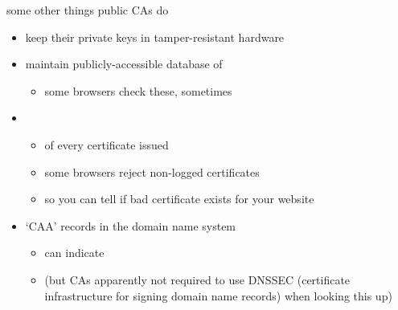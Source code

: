 \begin{frame}{some other things public CAs do}
    \begin{itemize}
    \item keep their private keys in tamper-resistant hardware
    \item maintain publicly-accessible database of 
        \begin{itemize}
        \item some browsers check these, sometimes
        \end{itemize}
    \item {}
        \begin{itemize}
            \item {} of every certificate issued
            \item some browsers reject non-logged certificates
            \item so you can tell if bad certificate exists for your website
        \end{itemize}
    \item `CAA' records in the domain name system
        \begin{itemize}
            \item can indicate 
        \item (but CAs apparently not required to use DNSSEC (certificate infrastructure for signing domain name records) when looking this up)
        \end{itemize}
    \end{itemize}
\end{frame}
